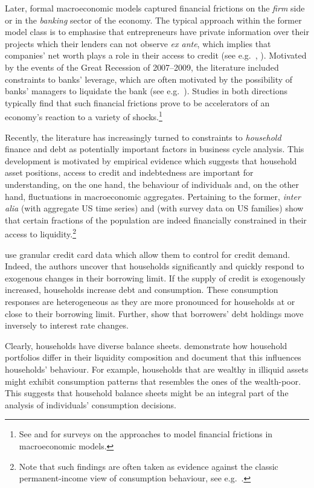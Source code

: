 \documentclass[12pt]{article} %
\numberwithin{equation}{section} %
\begin{document}
Later, formal macroeconomic models captured financial frictions on the \textit{firm} side or in the \textit{banking} sector of the economy. The typical approach within the former model class is to emphasise that entrepreneurs have private information over their projects which their lenders can not observe \textit{ex ante}, which implies that companies' net worth plays a role in their access to credit (see e.g.~\cite{bg1989}, \cite{bgg1999}). Motivated by the events of the Great Recession of 2007--2009, the literature included constraints to banks' leverage, which are often motivated by the possibility of banks' managers to liquidate the bank (see e.g.~\cite{gertler2011}). Studies in both directions typically find that such financial frictions prove to be accelerators of an economy's reaction to a variety of shocks.\footnote{See \textcite{brunnermeier2012} and \textcite{christiano2022} for surveys on the approaches to model financial frictions in macroeconomic models.}

Recently, the literature has increasingly turned to constraints to \textit{household} finance and debt as potentially important factors in business cycle analysis. This development is motivated by empirical evidence which suggests that household asset positions, access to credit and indebtedness are important for understanding, on the one hand, the behaviour of individuals and, on the other hand, fluctuations in macroeconomic aggregates. Pertaining to the former, \textit{inter alia} \textcite{campbell1989} (with aggregate US time series) and \textcite{zeldes1989} (with survey data on US families) show that certain fractions of the population are indeed financially constrained in their access to liquidity.\footnote{Note that such findings are often taken as evidence against the classic permanent-income view of consumption behaviour, see e.g.~\textcite{kaplan2014}.}

\textcite{gross2002} use granular credit card data which allow them to control for credit demand. Indeed, the authors uncover that households significantly and quickly respond to exogenous changes in their borrowing limit. If the supply of credit is exogenously increased, households increase debt and consumption. These consumption responses are heterogeneous as they are more pronounced for households at or close to their borrowing limit. Further, \textcite{gross2002} show that borrowers' debt holdings move inversely to interest rate changes.

Clearly, households have diverse balance sheets. \textcite{kaplan2014} demonstrate how household portfolios differ in their liquidity composition and document that this influences households' behaviour. For example, households that are wealthy in illiquid assets might exhibit consumption patterns that resembles the ones of the wealth-poor. This suggests that household balance sheets might be an integral part of the analysis of individuals' consumption decisions.
\end{document}
